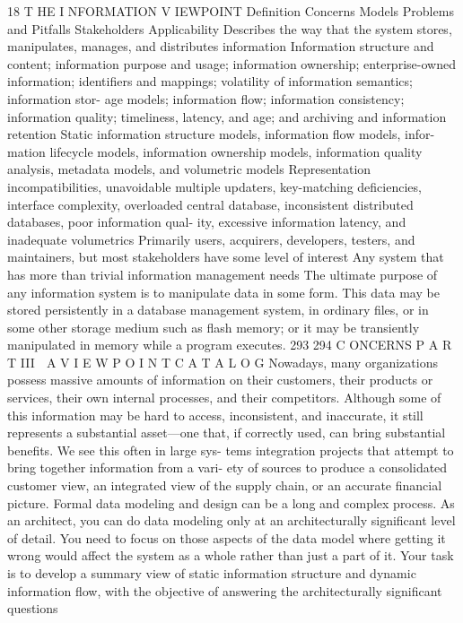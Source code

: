 18
T HE I NFORMATION
V IEWPOINT
Definition
Concerns
Models
Problems and
Pitfalls
Stakeholders
Applicability
Describes the way that the system stores, manipulates, manages,
and distributes information
Information structure and content; information purpose and usage;
information ownership; enterprise-owned information; identifiers
and mappings; volatility of information semantics; information stor-
age models; information flow; information consistency; information
quality; timeliness, latency, and age; and archiving and information
retention
Static information structure models, information flow models, infor-
mation lifecycle models, information ownership models, information
quality analysis, metadata models, and volumetric models
Representation incompatibilities, unavoidable multiple updaters,
key-matching deficiencies, interface complexity, overloaded central
database, inconsistent distributed databases, poor information qual-
ity, excessive information latency, and inadequate volumetrics
Primarily users, acquirers, developers, testers, and maintainers, but
most stakeholders have some level of interest
Any system that has more than trivial information management
needs
The ultimate purpose of any information system is to manipulate data in
some form. This data may be stored persistently in a database management
system, in ordinary files, or in some other storage medium such as flash
memory; or it may be transiently manipulated in memory while a program
executes.
293
294
C ONCERNS
P A R T III  A V I E W P O I N T C A T A L O G
Nowadays, many organizations possess massive amounts of information
on their customers, their products or services, their own internal processes, and
their competitors. Although some of this information may be hard to access,
inconsistent, and inaccurate, it still represents a substantial asset—one that, if
correctly used, can bring substantial benefits. We see this often in large sys-
tems integration projects that attempt to bring together information from a vari-
ety of sources to produce a consolidated customer view, an integrated view of
the supply chain, or an accurate financial picture.
Formal data modeling and design can be a long and complex process. As an
architect, you can do data modeling only at an architecturally significant level of
detail. You need to focus on those aspects of the data model where getting it wrong
would affect the system as a whole rather than just a part of it. Your task is to
develop a summary view of static information structure and dynamic information
flow, with the objective of answering the architecturally significant questions
